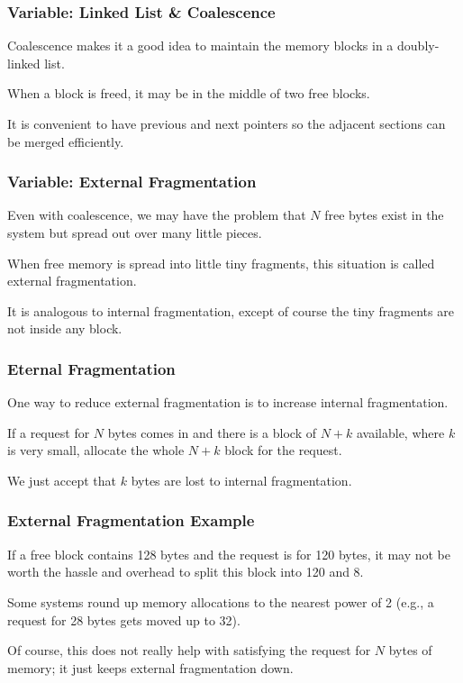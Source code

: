 \begin{frame}
\frametitle{Variable: Linked List \& Coalescence}

Coalescence makes it a good idea to maintain the memory blocks in a doubly-linked list.

When a block is freed, it may be in the middle of two free blocks. 

It is convenient to have previous and next pointers so the adjacent sections can be merged efficiently.


\end{frame}

\begin{frame}
\frametitle{Variable: External Fragmentation}

Even with coalescence, we may have the problem that $N$ free bytes exist in the system but spread out over many little pieces.

When free memory is spread into little tiny fragments, this situation is called \alert{external fragmentation}. 

It is analogous to internal fragmentation, except of course the tiny fragments are not inside any block.


\end{frame}

\begin{frame}
\frametitle{Eternal Fragmentation}

One way to reduce external fragmentation is to increase internal fragmentation. 

If a request for $N$ bytes comes in and there is a block of $N+k$ available, where $k$ is very small, allocate the whole $N+k$ block for the request.

We just accept that $k$ bytes are lost to internal fragmentation.

\end{frame}

\begin{frame}
\frametitle{External Fragmentation Example}

If a free block contains 128 bytes and the request is for 120 bytes, it may not be worth the hassle and overhead to split this block into 120 and 8. 

Some systems round up memory allocations to the nearest power of 2 (e.g., a request for 28 bytes gets moved up to 32). 

Of course, this does not really help with satisfying the request for $N$ bytes of memory; it just keeps external fragmentation down.

\end{frame}

